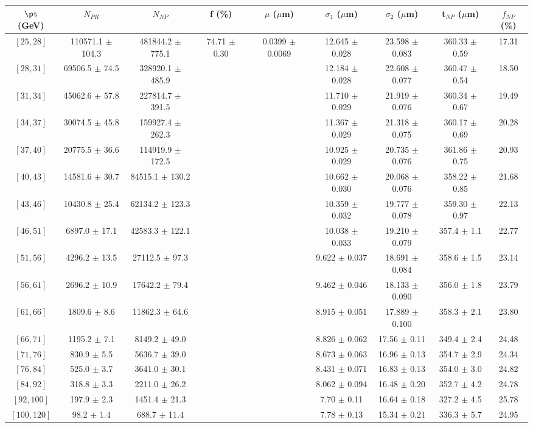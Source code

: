 \begin{tabular}{c||c|c|c|c|c|c|c||c}
$\pt$ (GeV) & $N_{PR}$ & $N_{NP}$ & f (\%) & $\mu$ ($\mu$m) & $\sigma_1$ ($\mu$m) & $\sigma_2$ ($\mu$m)  & t$_{NP}$ ($\mu$m) & $f_{NP}$ (\%) \\
\hline
$[25, 28]$ & 110571.1 $\pm$ 104.3 & 481844.2 $\pm$ 775.1 & \multirow{17}{*}{74.71 $\pm$ 0.30} & \multirow{17}{*}{0.0399 $\pm$ 0.0069} & 12.645 $\pm$ 0.028 & 23.598 $\pm$ 0.083 & 360.33 $\pm$ 0.59 & 17.31\\
$[28, 31]$ & 69506.5 $\pm$ 74.5 & 328920.1 $\pm$ 485.9 &  &  & 12.184 $\pm$ 0.028 & 22.608 $\pm$ 0.077 & 360.47 $\pm$ 0.54 & 18.50\\
$[31, 34]$ & 45062.6 $\pm$ 57.8 & 227814.7 $\pm$ 391.5 &  &  & 11.710 $\pm$ 0.029 & 21.919 $\pm$ 0.076 & 360.34 $\pm$ 0.67 & 19.49\\
$[34, 37]$ & 30074.5 $\pm$ 45.8 & 159927.4 $\pm$ 262.3 &  &  & 11.367 $\pm$ 0.029 & 21.318 $\pm$ 0.075 & 360.17 $\pm$ 0.69 & 20.28\\
$[37, 40]$ & 20775.5 $\pm$ 36.6 & 114919.9 $\pm$ 172.5 &  &  & 10.925 $\pm$ 0.029 & 20.735 $\pm$ 0.076 & 361.86 $\pm$ 0.75 & 20.93\\
$[40, 43]$ & 14581.6 $\pm$ 30.7 & 84515.1 $\pm$ 130.2 &  &  & 10.662 $\pm$ 0.030 & 20.068 $\pm$ 0.076 & 358.22 $\pm$ 0.85 & 21.68\\
$[43, 46]$ & 10430.8 $\pm$ 25.4 & 62134.2 $\pm$ 123.3 &  &  & 10.359 $\pm$ 0.032 & 19.777 $\pm$ 0.078 & 359.30 $\pm$ 0.97 & 22.13\\
$[46, 51]$ & 6897.0 $\pm$ 17.1 & 42583.3 $\pm$ 122.1 &  &  & 10.038 $\pm$ 0.033 & 19.210 $\pm$ 0.079 & 357.4 $\pm$ 1.1 & 22.77\\
$[51, 56]$ & 4296.2 $\pm$ 13.5 & 27112.5 $\pm$ 97.3 &  &  & 9.622 $\pm$ 0.037 & 18.691 $\pm$ 0.084 & 358.6 $\pm$ 1.5 & 23.14\\
$[56, 61]$ & 2696.2 $\pm$ 10.9 & 17642.2 $\pm$ 79.4 &  &  & 9.462 $\pm$ 0.046 & 18.133 $\pm$ 0.090 & 356.0 $\pm$ 1.8 & 23.79\\
$[61, 66]$ & 1809.6 $\pm$ 8.6 & 11862.3 $\pm$ 64.6 &  &  & 8.915 $\pm$ 0.051 & 17.889 $\pm$ 0.100 & 358.3 $\pm$ 2.1 & 23.80\\
$[66, 71]$ & 1195.2 $\pm$ 7.1 & 8149.2 $\pm$ 49.0 &  &  & 8.826 $\pm$ 0.062 & 17.56 $\pm$ 0.11 & 349.4 $\pm$ 2.4 & 24.48\\
$[71, 76]$ & 830.9 $\pm$ 5.5 & 5636.7 $\pm$ 39.0 &  &  & 8.673 $\pm$ 0.063 & 16.96 $\pm$ 0.13 & 354.7 $\pm$ 2.9 & 24.34\\
$[76, 84]$ & 525.0 $\pm$ 3.7 & 3641.0 $\pm$ 30.1 &  &  & 8.431 $\pm$ 0.071 & 16.83 $\pm$ 0.13 & 354.0 $\pm$ 3.0 & 24.82\\
$[84, 92]$ & 318.8 $\pm$ 3.3 & 2211.0 $\pm$ 26.2 &  &  & 8.062 $\pm$ 0.094 & 16.48 $\pm$ 0.20 & 352.7 $\pm$ 4.2 & 24.78\\
$[92, 100]$ & 197.9 $\pm$ 2.3 & 1451.4 $\pm$ 21.3 &  &  & 7.70 $\pm$ 0.11 & 16.64 $\pm$ 0.18 & 327.2 $\pm$ 4.5 & 25.78\\
$[100, 120]$ & 98.2 $\pm$ 1.4 & 688.7 $\pm$ 11.4 &  &  & 7.78 $\pm$ 0.13 & 15.34 $\pm$ 0.21 & 336.3 $\pm$ 5.7 & 24.95\\
\end{tabular}
